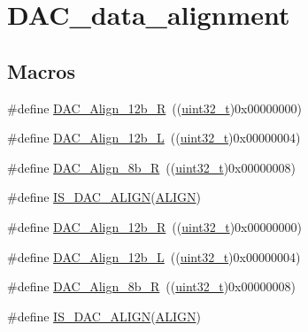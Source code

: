 \hypertarget{group___d_a_c__data__alignment}{}\section{D\+A\+C\+\_\+data\+\_\+alignment}
\label{group___d_a_c__data__alignment}
\subsection*{Macros}
\begin{DoxyCompactItemize}
\item 
\#define \hyperlink{group___d_a_c__data__alignment_ga0f2a6fc71aaf90a27b0caf1bd06e73f2}{D\+A\+C\+\_\+\+Align\+\_\+12b\+\_\+R}~((\hyperlink{_p_e___types_8h_a33594304e786b158f3fb30289278f5af}{uint32\+\_\+t})0x00000000)
\item 
\#define \hyperlink{group___d_a_c__data__alignment_gaf3a46d37092eac0d4c9c1039e68208d4}{D\+A\+C\+\_\+\+Align\+\_\+12b\+\_\+L}~((\hyperlink{_p_e___types_8h_a33594304e786b158f3fb30289278f5af}{uint32\+\_\+t})0x00000004)
\item 
\#define \hyperlink{group___d_a_c__data__alignment_gaa633fbcf85e97e12c4894eaed530dd8f}{D\+A\+C\+\_\+\+Align\+\_\+8b\+\_\+R}~((\hyperlink{_p_e___types_8h_a33594304e786b158f3fb30289278f5af}{uint32\+\_\+t})0x00000008)
\item 
\#define \hyperlink{group___d_a_c__data__alignment_ga7779c36606827a6a2c4423414a441bde}{I\+S\+\_\+\+D\+A\+C\+\_\+\+A\+L\+I\+GN}(\hyperlink{usb__devapi_8h_ae4ff5a07c6ff43ed11a3887ef7d524f2}{A\+L\+I\+GN})
\item 
\#define \hyperlink{group___d_a_c__data__alignment_ga0f2a6fc71aaf90a27b0caf1bd06e73f2}{D\+A\+C\+\_\+\+Align\+\_\+12b\+\_\+R}~((\hyperlink{_p_e___types_8h_a33594304e786b158f3fb30289278f5af}{uint32\+\_\+t})0x00000000)
\item 
\#define \hyperlink{group___d_a_c__data__alignment_gaf3a46d37092eac0d4c9c1039e68208d4}{D\+A\+C\+\_\+\+Align\+\_\+12b\+\_\+L}~((\hyperlink{_p_e___types_8h_a33594304e786b158f3fb30289278f5af}{uint32\+\_\+t})0x00000004)
\item 
\#define \hyperlink{group___d_a_c__data__alignment_gaa633fbcf85e97e12c4894eaed530dd8f}{D\+A\+C\+\_\+\+Align\+\_\+8b\+\_\+R}~((\hyperlink{_p_e___types_8h_a33594304e786b158f3fb30289278f5af}{uint32\+\_\+t})0x00000008)
\item 
\#define \hyperlink{group___d_a_c__data__alignment_ga7779c36606827a6a2c4423414a441bde}{I\+S\+\_\+\+D\+A\+C\+\_\+\+A\+L\+I\+GN}(\hyperlink{usb__devapi_8h_ae4ff5a07c6ff43ed11a3887ef7d524f2}{A\+L\+I\+GN})
\end{DoxyCompactItemize}


